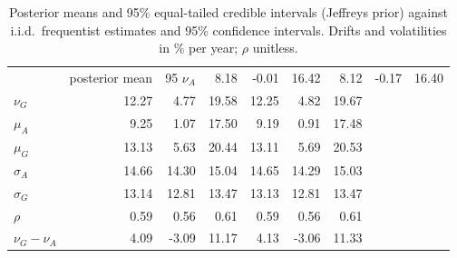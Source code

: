 \begin{table}
\caption{Posterior means and 95\% equal-tailed credible intervals (Jeffreys prior) against i.i.d.\ frequentist estimates and 95\% confidence intervals. Drifts and volatilities in \% per year; $\rho$ unitless.}
\label{tab:bayes}
\begin{tabular}{lrrrrrr}
\toprule
 & posterior mean & 95%
\midrule
$\nu_A$ & 8.18 & -0.01 & 16.42 & 8.12 & -0.17 & 16.40 \\
$\nu_G$ & 12.27 & 4.77 & 19.58 & 12.25 & 4.82 & 19.67 \\
$\mu_A$ & 9.25 & 1.07 & 17.50 & 9.19 & 0.91 & 17.48 \\
$\mu_G$ & 13.13 & 5.63 & 20.44 & 13.11 & 5.69 & 20.53 \\
$\sigma_A$ & 14.66 & 14.30 & 15.04 & 14.65 & 14.29 & 15.03 \\
$\sigma_G$ & 13.14 & 12.81 & 13.47 & 13.13 & 12.81 & 13.47 \\
$\rho$ & 0.59 & 0.56 & 0.61 & 0.59 & 0.56 & 0.61 \\
$\nu_G-\nu_A$ & 4.09 & -3.09 & 11.17 & 4.13 & -3.06 & 11.33 \\
\bottomrule
\end{tabular}
\end{table}
